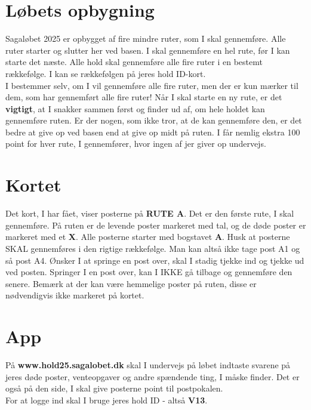 \section{Løbets opbygning}
Sagaløbet 2025 er opbygget af fire mindre ruter, som I skal gennemføre. Alle ruter starter og slutter her ved basen. I skal gennemføre en hel rute, før I kan starte det næste. Alle hold skal gennemføre alle fire ruter i en bestemt rækkefølge. I kan se rækkefølgen på jeres hold ID-kort.\\\newline
I bestemmer selv, om I vil gennemføre alle fire ruter, men der er kun mærker til dem, som har gennemført alle fire ruter! Når I skal starte en ny rute, er det \textbf{vigtigt}, at I snakker sammen først og finder ud af, om hele holdet kan gennemføre ruten. Er der nogen, som ikke tror, at de kan gennemføre den, er det bedre at give op ved basen end at give op midt på ruten. I får nemlig ekstra 100 point for hver rute, I gennemfører, hvor ingen af jer giver op undervejs.\\
\section{Kortet}
Det kort, I har fået, viser posterne på \textbf{RUTE A}. Det er den første rute, I skal gennemføre. På ruten er de levende poster markeret med tal, og de døde poster er markeret med et \textbf{X}. Alle posterne starter med bogstavet \textbf{A}. Husk at posterne SKAL gennemføres i den rigtige rækkefølge. Man kan altså ikke tage post A1 og så post A4. Ønsker I at springe en post over, skal I stadig tjekke ind og tjekke ud ved posten. Springer I en post over, kan I IKKE gå tilbage og gennemføre den senere. Bemærk at der kan være hemmelige poster på ruten, disse er nødvendigvis ikke markeret på kortet.
\section{App}
På \textbf{www.hold25.sagalobet.dk} skal I undervejs på løbet indtaste svarene på jeres døde poster, venteopgaver og andre spændende ting, I måske finder. Det er også på den side, I skal give posterne point til postpokalen.\\
For at logge ind skal I bruge jeres hold ID - altså \textbf{V13}.
\newpage
